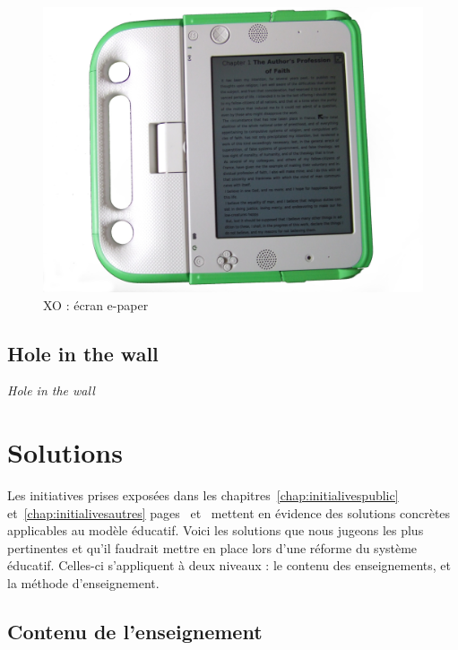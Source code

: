 \begin{minipage}{.5\linewidth}
  \begin{figure}[H]
    \includegraphics[width=\linewidth]{../resources/illustrations/olpc_display}
    \caption{XO : écran e-paper}
  \end{figure}
\end{minipage}

\section{Hole in the wall}
\textit{Hole in the wall}





\chapter{Solutions}
\label{chap:solutions}

Les initiatives prises exposées dans les chapitres~\ref{chap:initialivespublic} et~\ref{chap:initialivesautres} pages~\pageref{chap:initialivespublic} et~\pageref{chap:initialivesautres} mettent en évidence des solutions concrètes applicables au modèle éducatif. Voici les solutions que nous jugeons les plus pertinentes et qu'il faudrait mettre en place lors d'une réforme du système éducatif. Celles-ci s'appliquent à deux niveaux : le contenu des enseignements, et la méthode d'enseignement.

\section{Contenu de l'enseignement}
